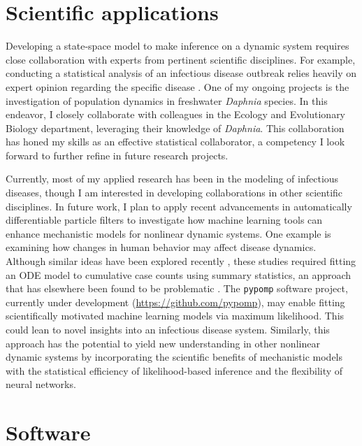 \documentclass{article}
\begin{document}
\section{Scientific applications}

Developing a state-space model to make inference on a dynamic system requires close collaboration with experts from pertinent scientific disciplines.
For example, conducting a statistical analysis of an infectious disease outbreak relies heavily on expert opinion regarding the specific disease \cite{wheeler24}.
One of my ongoing projects is the investigation of population dynamics in freshwater \emph{Daphnia} species.
In this endeavor, I closely collaborate with colleagues in the Ecology and Evolutionary Biology department, leveraging their knowledge of \emph{Daphnia}.
This collaboration has honed my skills as an effective statistical collaborator, a competency I look forward to further refine in future research projects.

Currently, most of my applied research has been in the modeling of infectious diseases, though I am interested in developing collaborations in other scientific disciplines.
In future work, I plan to apply recent advancements in automatically differentiable particle filters \cite{tan24} to investigate how machine learning tools can enhance mechanistic models for nonlinear dynamic systems.
One example is examining how changes in human behavior may affect disease dynamics.
Although similar ideas have been explored recently \cite{dandekar20,kim21}, these studies required fitting an ODE model to cumulative case counts using summary statistics, an approach that has elsewhere been found to be problematic \cite{king15}.
The \texttt{pypomp} software project, currently under development (\url{https://github.com/pypomp}), may enable fitting scientifically motivated machine learning models via maximum likelihood.
This could lean to novel insights into an infectious disease system.
Similarly, this approach has the potential to yield new understanding in other nonlinear dynamic systems by incorporating the scientific benefits of mechanistic models \cite{baker18} with the statistical efficiency of likelihood-based inference and the flexibility of neural networks.

\section{Software}\label{sec:software}
\end{document}
